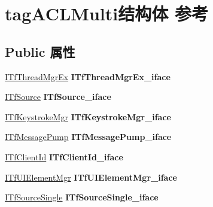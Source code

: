 \hypertarget{structtag_a_c_l_multi}{}\section{tag\+A\+C\+L\+Multi结构体 参考}
\label{structtag_a_c_l_multi}
\subsection*{Public 属性}
\begin{DoxyCompactItemize}
\item 
\mbox{\label{structtag_a_c_l_multi_aad2531bcf6c89c0f9368b07d7f465383}} 
\hyperlink{interface_i_tf_thread_mgr_ex}{I\+Tf\+Thread\+Mgr\+Ex} {\bfseries I\+Tf\+Thread\+Mgr\+Ex\+\_\+iface}
\item 
\mbox{\label{structtag_a_c_l_multi_abc50b708cbd81fa5ab9d5c3986c324f8}} 
\hyperlink{interface_i_tf_source}{I\+Tf\+Source} {\bfseries I\+Tf\+Source\+\_\+iface}
\item 
\mbox{\label{structtag_a_c_l_multi_a06b687e2107bb3e18e5fe79077059bd7}} 
\hyperlink{interface_i_tf_keystroke_mgr}{I\+Tf\+Keystroke\+Mgr} {\bfseries I\+Tf\+Keystroke\+Mgr\+\_\+iface}
\item 
\mbox{\label{structtag_a_c_l_multi_aa325e2d6d0ba9dd107c9ca14ea4cffe0}} 
\hyperlink{interface_i_tf_message_pump}{I\+Tf\+Message\+Pump} {\bfseries I\+Tf\+Message\+Pump\+\_\+iface}
\item 
\mbox{\label{structtag_a_c_l_multi_abd1a62d6b635d7f2cc20179bf9ba65bd}} 
\hyperlink{interface_i_tf_client_id}{I\+Tf\+Client\+Id} {\bfseries I\+Tf\+Client\+Id\+\_\+iface}
\item 
\mbox{\label{structtag_a_c_l_multi_aabac76cf909791b72481affd4444e968}} 
\hyperlink{interface_i_tf_u_i_element_mgr}{I\+Tf\+U\+I\+Element\+Mgr} {\bfseries I\+Tf\+U\+I\+Element\+Mgr\+\_\+iface}
\item 
\mbox{\label{structtag_a_c_l_multi_ab7cf8f450152f1ee9f3c1dfeb78a6bfc}} 
\hyperlink{interface_i_tf_source_single}{I\+Tf\+Source\+Single} {\bfseries I\+Tf\+Source\+Single\+\_\+iface}

\end{DoxyCompactItemize}

